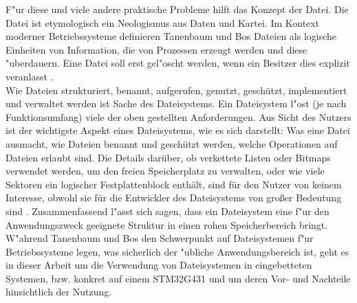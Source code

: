 \documentclass[11pt]{article}
\begin{document}
F"ur diese und viele andere praktische Probleme hilft das Konzept der Datei.
Die Datei ist etymologisch ein Neologismus aus Daten und Kartei.
Im Kontext moderner Betriebssysteme definieren Tanenbaum und Bos Dateien als 
logische Einheiten von Information, die von Prozessen erzeugt werden und diese "uberdauern.
Eine Datei soll erst gel"oscht werden, wenn ein Besitzer dies explizit veranlasst \cite{tanenbaum2015}.\\
Wie Dateien strukturiert, benannt, aufgerufen, genutzt, geschützt, implementiert und verwaltet werden ist Sache
des Dateisystems. Ein Dateisystem l"ost (je nach Funktionsumfang) viele der oben gestellten Anforderungen.
Aus Sicht des Nutzers ist der wichtigste Aspekt eines Dateisystems,
wie es sich darstellt: Was eine Datei ausmacht, wie Dateien benannt und geschützt werden, 
welche Operationen auf Dateien erlaubt sind. Die Details darüber, ob verkettete Listen oder Bitmaps verwendet werden, 
um den freien Speicherplatz zu verwalten, oder wie viele Sektoren ein logischer Festplattenblock enthält, sind für den Nutzer von keinem Interesse,
obwohl sie für die Entwickler des Dateisystems von großer Bedeutung sind \cite{tanenbaum2015}.
Zusammenfassend l"asst sich sagen, dass ein Dateisystem eine f"ur den Anwendungszweck geeignete Struktur in einen rohen Speicherbereich bringt.
W"ahrend Tanenbaum und Bos den Schwerpunkt auf Dateisystemen f"ur Betriebssysteme legen, 
was sicherlich der "ubliche Anwendungsbereich ist, geht es in dieser Arbeit um die Verwendung
von Dateisystemen in eingebetteten Systemen, bzw. konkret auf einem STM32G431 und um deren Vor- und Nachteile hinsichtlich der Nutzung.
\end{document}
